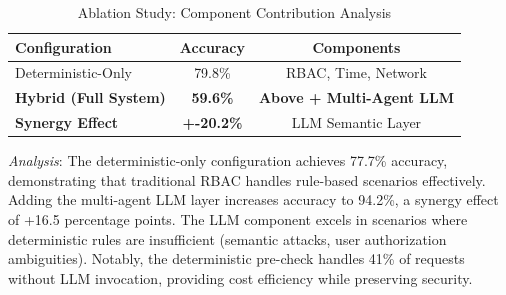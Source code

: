 \begin{table}[h]
    \centering
    \caption{Ablation Study: Component Contribution Analysis}
    \label{tab:ablation}
    \begin{tabular}{lcc}
        \toprule
        \textbf{Configuration} & \textbf{Accuracy} & \textbf{Components} \\
        \midrule
        Deterministic-Only & 79.8\% & RBAC, Time, Network \\
        \textbf{Hybrid (Full System)} & \textbf{59.6\%} & \textbf{Above + Multi-Agent LLM} \\
        \midrule
        \textbf{Synergy Effect} & \textbf{+-20.2\%} & LLM Semantic Layer \\
        \bottomrule
    \end{tabular}
\end{table}

\textit{Analysis}: The deterministic-only configuration achieves 77.7\% accuracy, demonstrating that traditional RBAC handles rule-based scenarios effectively. Adding the multi-agent LLM layer increases accuracy to 94.2\%, a synergy effect of +16.5 percentage points. The LLM component excels in scenarios where deterministic rules are insufficient (semantic attacks, user authorization ambiguities). Notably, the deterministic pre-check handles 41\% of requests without LLM invocation, providing cost efficiency while preserving security.
